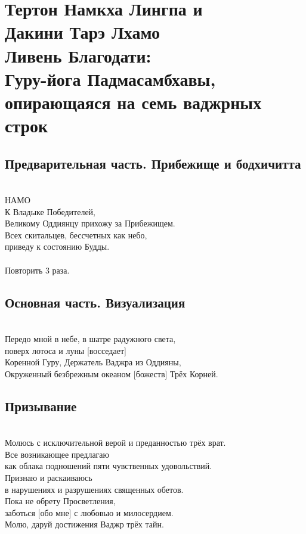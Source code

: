 \section{Тертон Намкха Лингпа и \\ Дакини Тарэ Лхамо
 \\Ливень Благодати:\\Гуру-йога Падмасамбхавы, \\опирающаяся на семь ваджрных строк}

\subsection{Предварительная часть. Прибежище и бодхичитта}
\\
НАМО\\
К Владыке Победителей, \\
\indent Великому Оддиянцу прихожу за Прибежищем.\\
Всех скитальцев, бессчетных как небо, \\
\indent приведу к состоянию Будды.\\
\\
Повторить 3 раза.\\

\subsection{Основная часть. Визуализация}
\\
Передо мной в небе, в шатре радужного света, \\ \indent поверх лотоса и луны [восседает]\\
Коренной Гуру, Держатель Ваджра из Оддияны,\\
Окруженный безбрежным океаном [божеств] Трёх Корней.\\

\subsection*{Призывание}
\\
Молюсь с исключительной верой и преданностью трёх врат.\\
Все возникающее предлагаю \\ \indent как облака подношений пяти чувственных удовольствий.\\
Признаю и раскаиваюсь \\ \indent в нарушениях и разрушениях священных обетов.\\
Пока не обрету Просветления, \\ \indent заботься [обо мне] с любовью и милосердием.\\
Молю, даруй достижения Ваджр трёх тайн.\\

